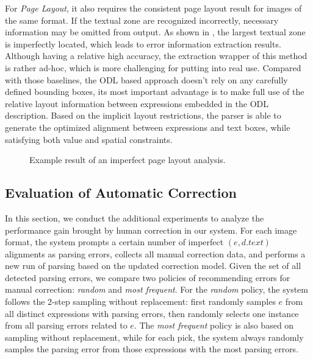 For \textit{Page Layout},
it also requires the consistent page layout result for images of the same format.
If the textual zone are recognized incorrectly,
necessary information may be omitted from output.
As shown in , the largest textual zone is imperfectly located,
which leads to error information extraction results.
Although having a relative high accuracy,
the extraction wrapper of this method is rather ad-hoc,
which is more challenging for putting into real use.
Compared with those baselines,
the ODL based approach doesn't rely on any carefully defined bounding boxes,
its most important advantage is to make full use of the relative layout
information between expressions embedded in the ODL description.
Based on the implicit layout restrictions,
the parser is able to generate the optimized alignment between
expressions and text boxes, while satisfying both value and spatial constraints.

\begin{figure}[ht]
\centering
{}
\caption{Example result of an imperfect page layout analysis.}
\label{fig:errorpl}
\end{figure}


\subsection{Evaluation of Automatic Correction}
In this section, we conduct the additional experiments to
analyze the performance gain brought by human correction in our system.
For each image format, the system prompts a certain number of
imperfect $(e, d.text)$ alignments as parsing errors,
collects all manual correction data,
and performs a new run of parsing based on the updated correction model.
Given the set of all detected parsing errors,
we compare two policies of recommending errors for manual correction:
\textit{random} and \textit{most frequent}.
For the \textit{random} policy,
the system follows the 2-step sampling without replacement:
first randomly samples $e$ from all distinct expressions with parsing errors,
then randomly selects one instance from all parsing errors related to $e$.
The \textit{most frequent} policy is also based on sampling without replacement,
while for each pick,
the system always randomly samples the parsing error from those expressions
with the most parsing errors.

